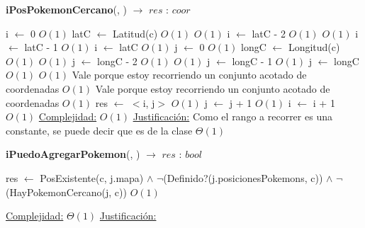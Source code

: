 \begin{algorithm}[H]{\textbf{iPosPokemonCercano}(, )  $\to$ $res$ : $coor$} 
	{}
	\begin{algorithmic}
		\State i $\gets$ 0 \Comment $O(1)$
		\State latC $\gets$ Latitud(c)	\Comment $O(1)$
			\Comment $O(1)$
			\State i $\gets$ latC - 2	\Comment $O(1)$
		\Else
				\Comment $O(1)$
				\State i $\gets$ latC - 1	\Comment $O(1)$
			\Else
				\State i $\gets$ latC	\Comment $O(1)$
			\EndIf
		\EndIf
		\State j $\gets$ 0 \Comment $O(1)$
		\State longC $\gets$ Longitud(c)	\Comment $O(1)$
			\Comment $O(1)$
			\State j $\gets$ longC - 2	\Comment $O(1)$
		\Else
				\Comment $O(1)$
				\State j $\gets$ longC - 1	\Comment $O(1)$
			\Else
				\State j $\gets$ longC	\Comment $O(1)$
			\EndIf
		\EndIf
			\Comment $O(1)$ {Vale porque estoy recorriendo un conjunto acotado de coordenadas}
				\Comment $O(1)$ {Vale porque estoy recorriendo un conjunto acotado de coordenadas}
					\Comment $O(1)$
					\State res $\gets$ $<$i, j$>$	\Comment $O(1)$ 
				\EndIf
				\State j $\gets$ j + 1	\Comment $O(1)$
			\EndWhile
			\State i $\gets$ i + 1	\Comment $O(1)$
		\EndWhile
		\medskip
		\Statex \underline{Complejidad:} $O(1)$
		\Statex \underline{Justificación:} Como el rango a recorrer es una constante, se puede decir que es de la clase $\Theta(1)$ 
    \end{algorithmic}
\end{algorithm}

\begin{algorithm}[H]{\textbf{iPuedoAgregarPokemon}(, ) $\to$ $res$ : $bool$} 
	\begin{algorithmic}
		\State res $\gets$ PosExistente(c, j.mapa) $\land$ $\lnot$(Definido?(j.posicionesPokemons, c)) $\land$ $\lnot$(HayPokemonCercano(j, c))  \Comment $O(1)$
	
		\medskip
		\Statex \underline{Complejidad:} $\Theta(1)$
		\Statex \underline{Justificación:}
     \end{algorithmic}
 \end{algorithm}
 
